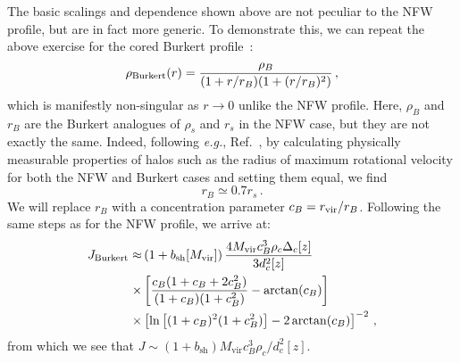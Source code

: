 The basic scalings and dependence shown above are not peculiar to the NFW profile, but are in fact more generic. To demonstrate this, we can repeat the above exercise for the cored Burkert profile~\cite{Burkert:1995yz}:
\begin{equation}
\rho_{\rm Burkert}(r) = \frac{\rho_B}{(1+r/r_B)(1+(r/r_B)^2)}\,,
\end{equation}
which is manifestly non-singular as $r \to 0$ unlike the NFW profile.  Here, $\rho_B$ and $r_B$ are the Burkert analogues of $\rho_s$ and $r_s$ in the NFW case, but they are not exactly the same.  Indeed, following \emph{e.g.}, Ref.~\cite{Bartels:2015uba}, by calculating physically measurable properties of halos such as the radius of maximum rotational velocity for both the NFW and Burkert cases and setting them equal, we find
\begin{equation}
r_B \simeq 0.7 r_s\,.
\end{equation}
We will replace $r_B$ with a concentration parameter $c_B = r_{\rm vir}/r_B$.  Following the same steps as for the NFW profile, we arrive at:
\begin{align}
J_{\rm Burkert} \approx &\left(1+b_\text{sh}[M_\text{vir}]\right) \frac{4M_{\rm vir} c_B^3 \rho_c \Delta_c[z]}{3 d_c^2[z]} \\
\times &\left[ \frac{c_B(1+c_B+2c_B^2)}{(1+c_B)(1+c_B^2)} - \arctan(c_B) \right] \notag \\
\times &\left[ \ln \left[ (1+c_B)^2 (1+c_B^2) \right] - 2 \arctan(c_B) \right]^{-2}\,, \notag
\end{align}
from which we see that $J \sim (1+b_\text{sh}) M_\text{vir} c_B^3\rho_c/d_c^2[z]$.

